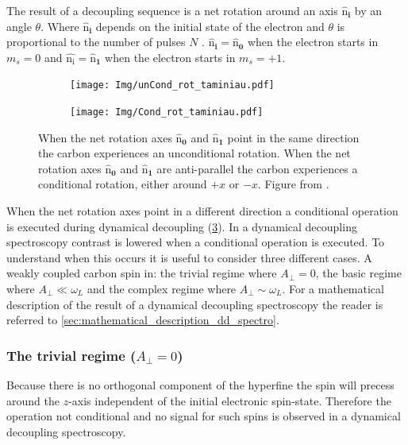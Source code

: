 The result of a decoupling sequence is a net rotation around an axis $\bm{\hat{\mathrm{n}}_i}$ by an angle $\theta$.
Where $\bm{\hat{\mathrm{n}}_i}$ depends on the initial state of the electron and $\theta$ is proportional to the number of pulses $N$ \citep{Taminiau2012Detection}.
$\bm{\hat{\mathrm{n}}_i} =\bm{\hat{\mathrm{n}}_0}$ when the electron starts in $m_s = 0$ and $\bm{\hat{\mathrm{n_i}}} =\bm{\hat{\mathrm{n}}_1}$ when the electron starts in $m_s = +1$.

\begin{figure}[htbp]
    \begin{subfigure}[t]{0.49\textwidth}\centering
        \centering
        \caption{}
        \texttt{[image: Img/unCond\_rot\_taminiau.pdf]}
        \label{fig:uncond_rot}
    \end{subfigure}
    \begin{subfigure}[t]{0.49\textwidth}\centering
        \centering
        \caption{}
        \texttt{[image: Img/Cond\_rot\_taminiau.pdf]}
        \label{fig:cond_rot}
    \end{subfigure}
    \caption{ When the net rotation axes $\bm{\hat{\mathrm{n}}_0}$ and $\bm{\hat{\mathrm{n}}_1}$ point in the same direction the carbon experiences an unconditional rotation.  When the net rotation axes $\bm{\hat{\mathrm{n}}_0}$ and $\bm{\hat{\mathrm{n}}_1}$ are anti-parallel the carbon experiences a conditional rotation, either around $+x$ or $-x$. Figure from \citet{Taminiau2012Detection}.}
    \label{fig:conditional_and_unconditional_rotation}
\end{figure}

When the net rotation axes point in a different direction a conditional operation is executed during dynamical decoupling (\cref{fig:conditional_and_unconditional_rotation}).
In a dynamical decoupling spectroscopy contrast is lowered when a conditional operation is executed.
To understand when this occurs it is useful to consider three different cases.
A weakly coupled carbon spin in: the trivial regime where $A_\perp=0$, the basic regime where $A_\perp \ll \omega_L$ and the complex regime where $A_\perp \sim \omega_L$.
For a mathematical description of the result of a dynamical decoupling spectroscopy the reader is referred to \cref{sec:mathematical_description_dd_spectro}.

\subsubsection{The trivial regime ($A_\perp=0$)}
Because there is no orthogonal component of the hyperfine the spin will precess around the $z$-axis independent of the initial electronic spin-state.
Therefore the operation not conditional and no signal for such spins is observed in a dynamical decoupling spectroscopy.

